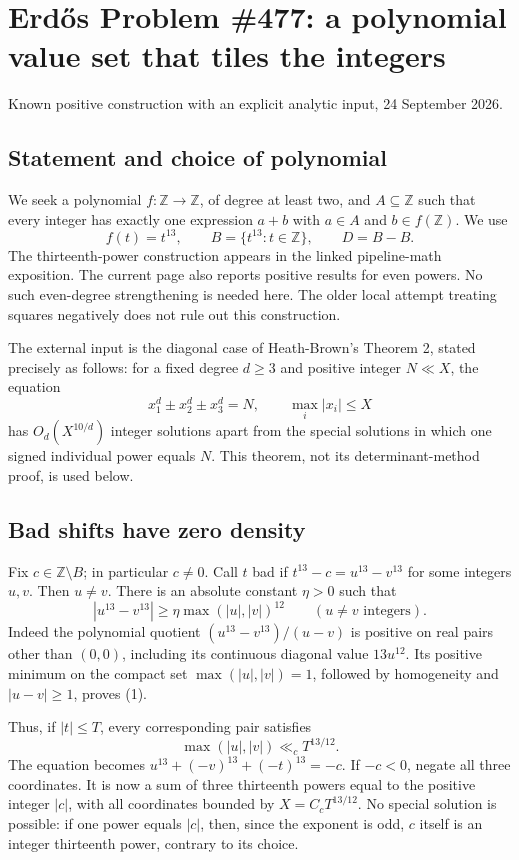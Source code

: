 \section{Erd\H{o}s Problem \#477: a polynomial value set that tiles the integers}
\noindent Known positive construction with an explicit analytic input, 24 September 2026.

\subsection*{Statement and choice of polynomial}
We seek a polynomial $f:\mathbb Z\to\mathbb Z$, of degree at least two, and $A\subseteq\mathbb Z$ such that every integer has exactly one expression $a+b$ with $a\in A$ and $b\in f(\mathbb Z)$. We use
\[f(t)=t^{13},\qquad B=\{t^{13}:t\in\mathbb Z\},\qquad D=B-B.\]
The thirteenth-power construction appears in the linked pipeline-math exposition. The current page also reports positive results for even powers. No such even-degree strengthening is needed here. The older local attempt treating squares negatively does not rule out this construction.

The external input is the diagonal case of Heath-Brown's Theorem 2, stated precisely as follows: for a fixed degree $d\ge3$ and positive integer $N\ll X$, the equation
\[x_1^d\mathbin{\pm}x_2^d\mathbin{\pm}x_3^d=N,\qquad \max_i|x_i|\le X\]
has $O_d(X^{10/d})$ integer solutions apart from the special solutions in which one signed individual power equals $N$. This theorem, not its determinant-method proof, is used below.

\subsection*{Bad shifts have zero density}
Fix $c\in\mathbb Z\setminus B$; in particular $c\ne0$. Call $t$ bad if $t^{13}-c=u^{13}-v^{13}$ for some integers $u,v$. Then $u\ne v$. There is an absolute constant $\eta>0$ such that
\[\left|u^{13}-v^{13}\right|\ge \eta\max(|u|,|v|)^{12}\qquad(u\ne v\text{ integers}).\tag{1}\]
Indeed the polynomial quotient $(u^{13}-v^{13})/(u-v)$ is positive on real pairs other than $(0,0)$, including its continuous diagonal value $13u^{12}$. Its positive minimum on the compact set $\max(|u|,|v|)=1$, followed by homogeneity and $|u-v|\ge1$, proves (1).

Thus, if $|t|\le T$, every corresponding pair satisfies
\[\max(|u|,|v|)\ll_c T^{13/12}.\]
The equation becomes $u^{13}+(-v)^{13}+(-t)^{13}=-c$. If $-c<0$, negate all three coordinates. It is now a sum of three thirteenth powers equal to the positive integer $|c|$, with all coordinates bounded by $X=C_c T^{13/12}$. No special solution is possible: if one power equals $|c|$, then, since the exponent is odd, $c$ itself is an integer thirteenth power, contrary to its choice.

